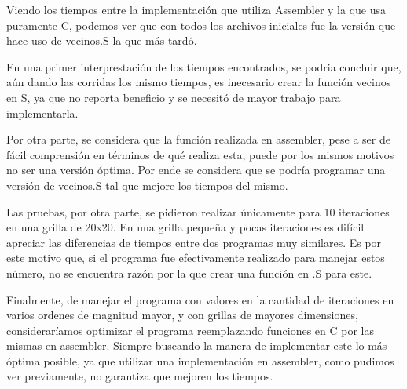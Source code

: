 \documentclass[a4paper,12pt]{article}
\numberwithin{equation}{section}
\numberwithin{figure}{section}
\begin{document}
	Viendo los tiempos entre la implementación que utiliza Assembler y la que usa puramente C, podemos ver que con todos los archivos iniciales fue la versión que hace uso de vecinos.S la que más tardó.
	
	En una primer interprestación de los tiempos encontrados, se podria concluir que, aún dando las corridas los mismo tiempos, es inecesario crear la función vecinos en S, ya que no reporta beneficio y se necesitó de mayor trabajo para implementarla.
	
	Por otra parte, se considera que la función realizada en assembler, pese a ser de fácil comprensión en términos de qué realiza esta, puede por los mismos motivos no ser una versión óptima. Por ende se considera que se podría programar una versión de vecinos.S tal que mejore los tiempos del mismo.
	
	Las pruebas, por otra parte, se pidieron realizar únicamente para 10 iteraciones en una grilla de 20x20. En una grilla pequeña y pocas iteraciones es difícil apreciar las diferencias de tiempos entre dos programas muy similares. Es por este motivo que, si el programa fue efectivamente realizado para manejar estos número, no se encuentra razón por la que crear una función en .S para este.
	
	Finalmente, de manejar el programa con valores en la cantidad de iteraciones en varios ordenes de magnitud mayor, y con grillas de mayores dimensiones, consideraríamos optimizar el programa reemplazando funciones en C por las mismas en assembler. Siempre buscando la manera de implementar este lo más óptima posible, ya que utilizar una implementación en assembler, como pudimos ver previamente, no garantiza que mejoren los tiempos.
	
\end{document}
